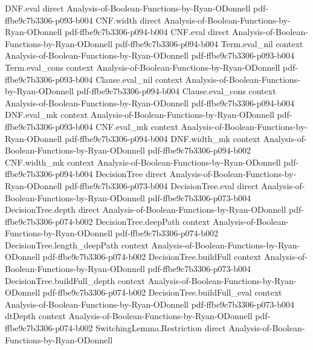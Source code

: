 \begin{theorem}
\proofstep
  {DNF.eval}
  {direct}
  {Analysis-of-Boolean-Functions-by-Ryan-ODonnell}
  {pdf-ffbe9c7b3306-p093-b004}
\proofstep
  {CNF.width}
  {direct}
  {Analysis-of-Boolean-Functions-by-Ryan-ODonnell}
  {pdf-ffbe9c7b3306-p094-b004}
\proofstep
  {CNF.eval}
  {direct}
  {Analysis-of-Boolean-Functions-by-Ryan-ODonnell}
  {pdf-ffbe9c7b3306-p094-b004}
\proofstep
  {Term.eval_nil}
  {context}
  {Analysis-of-Boolean-Functions-by-Ryan-ODonnell}
  {pdf-ffbe9c7b3306-p093-b004}
\proofstep
  {Term.eval_cons}
  {context}
  {Analysis-of-Boolean-Functions-by-Ryan-ODonnell}
  {pdf-ffbe9c7b3306-p093-b004}
\proofstep
  {Clause.eval_nil}
  {context}
  {Analysis-of-Boolean-Functions-by-Ryan-ODonnell}
  {pdf-ffbe9c7b3306-p094-b004}
\proofstep
  {Clause.eval_cons}
  {context}
  {Analysis-of-Boolean-Functions-by-Ryan-ODonnell}
  {pdf-ffbe9c7b3306-p094-b004}
\proofstep
  {DNF.eval_mk}
  {context}
  {Analysis-of-Boolean-Functions-by-Ryan-ODonnell}
  {pdf-ffbe9c7b3306-p093-b004}
\proofstep
  {CNF.eval_mk}
  {context}
  {Analysis-of-Boolean-Functions-by-Ryan-ODonnell}
  {pdf-ffbe9c7b3306-p094-b004}
\proofstep
  {DNF.width_mk}
  {context}
  {Analysis-of-Boolean-Functions-by-Ryan-ODonnell}
  {pdf-ffbe9c7b3306-p094-b002}
\proofstep
  {CNF.width_mk}
  {context}
  {Analysis-of-Boolean-Functions-by-Ryan-ODonnell}
  {pdf-ffbe9c7b3306-p094-b004}
\proofstep
  {DecisionTree}
  {direct}
  {Analysis-of-Boolean-Functions-by-Ryan-ODonnell}
  {pdf-ffbe9c7b3306-p073-b004}
\proofstep
  {DecisionTree.eval}
  {direct}
  {Analysis-of-Boolean-Functions-by-Ryan-ODonnell}
  {pdf-ffbe9c7b3306-p073-b004}
\proofstep
  {DecisionTree.depth}
  {direct}
  {Analysis-of-Boolean-Functions-by-Ryan-ODonnell}
  {pdf-ffbe9c7b3306-p074-b002}
\proofstep
  {DecisionTree.deepPath}
  {context}
  {Analysis-of-Boolean-Functions-by-Ryan-ODonnell}
  {pdf-ffbe9c7b3306-p074-b002}
\proofstep
  {DecisionTree.length_deepPath}
  {context}
  {Analysis-of-Boolean-Functions-by-Ryan-ODonnell}
  {pdf-ffbe9c7b3306-p074-b002}
\proofstep
  {DecisionTree.buildFull}
  {context}
  {Analysis-of-Boolean-Functions-by-Ryan-ODonnell}
  {pdf-ffbe9c7b3306-p073-b004}
\proofstep
  {DecisionTree.buildFull_depth}
  {context}
  {Analysis-of-Boolean-Functions-by-Ryan-ODonnell}
  {pdf-ffbe9c7b3306-p074-b002}
\proofstep
  {DecisionTree.buildFull_eval}
  {context}
  {Analysis-of-Boolean-Functions-by-Ryan-ODonnell}
  {pdf-ffbe9c7b3306-p073-b004}
\proofstep
  {dtDepth}
  {context}
  {Analysis-of-Boolean-Functions-by-Ryan-ODonnell}
  {pdf-ffbe9c7b3306-p074-b002}
\proofstep
  {SwitchingLemma.Restriction}
  {direct}
  {Analysis-of-Boolean-Functions-by-Ryan-ODonnell}

\end{theorem}
